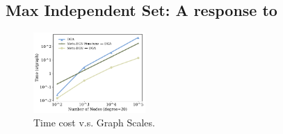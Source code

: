 
\subsection{Max Independent Set: A response to~\citep{angelini2022cracking}}\label{sec:MIS}


\begin{figure}
\vspace{-7mm}
         \centering
         \includegraphics[width=0.38\textwidth]{iclr2023/img/exp/time_20.pdf}
         \vspace{-0.6cm}
         \caption{Time cost v.s. Graph  Scales.}
         \vspace{-0.3cm}
         \label{fig:mis_time}
\end{figure}


